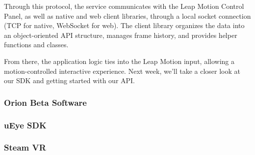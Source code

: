 Through this protocol, the service communicates with the Leap Motion Control Panel, as well as native and web client libraries, through a local socket connection (TCP for native, WebSocket for web). The client library organizes the data into an object-oriented API structure, manages frame history, and provides helper functions and classes.

From there, the application logic ties into the Leap Motion input, allowing a motion-controlled interactive experience. Next week, we’ll take a closer look at our SDK and getting started with our API. \cite{website:LeapMotionBlog}

\subsubsection{Orion Beta Software} \label{OBS}

\subsubsection{uEye SDK}
\subsubsection{Steam VR}


\newpage